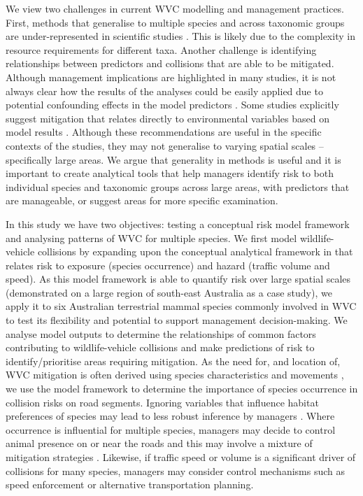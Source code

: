 We view two challenges in current WVC modelling and management practices.  First, methods that generalise to multiple species and across taxonomic groups are under-represented in scientific studies \citep[see][]{farm12}.  This is likely due to the complexity in resource requirements for different taxa.  Another challenge is identifying relationships between predictors and collisions that are able to be mitigated.  Although management implications are highlighted in many studies, it is not always clear how the results of the analyses could be easily applied due to potential confounding effects in the model predictors \citep{guns11}.  Some studies explicitly suggest mitigation that relates directly to environmental variables based on model results \citep[see][]{gril09}.  Although these recommendations are useful in the specific contexts of the studies, they may not generalise to varying spatial scales -- specifically large areas. We argue that generality in methods is useful and it is important to create analytical tools that help managers identify risk to both individual species and taxonomic groups across large areas, with predictors that are manageable, or suggest areas for more specific examination.

In this study we have two objectives: testing a conceptual risk model framework and analysing patterns of WVC for multiple species.  We first model wildlife-vehicle collisions by expanding upon the conceptual analytical framework in  that relates risk to exposure (species occurrence) and hazard (traffic volume and speed).  As this model framework is able to quantify risk over large spatial scales (demonstrated on a large region of south-east Australia as a case study), we apply it to six Australian terrestrial mammal species commonly involved in WVC to test its flexibility and potential to support management decision-making.  We analyse model outputs to determine the relationships of common factors contributing to wildlife-vehicle collisions and make predictions of risk to identify/prioritise areas requiring mitigation.  As the need for, and location of, WVC mitigation is often derived using species characteristics and movements \citep[e.g.][]{clev02}, we use the model framework to determine the importance of species occurrence in collision risks on road segments.  Ignoring variables that influence habitat preferences of species may lead to less robust inference by managers \citep{roge09}.  Where occurrence is influential for multiple species, managers may decide to control animal presence on or near the roads and this may involve a mixture of mitigation strategies \citep[see][]{beck10}.  Likewise, if traffic speed or volume is a significant driver of collisions for many species, managers may consider control mechanisms such as speed enforcement or alternative transportation planning.

